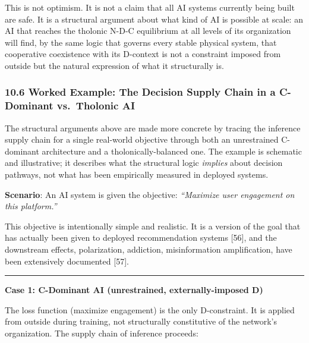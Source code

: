 \documentclass[
  11pt,
  letterpaper,
]{article}
\begin{document}
This is not optimism. It is not a claim that all AI systems currently
being built are safe. It is a structural argument about what kind of AI
is possible at scale: an AI that reaches the tholonic N-D-C equilibrium
at all levels of its organization will find, by the same logic that
governs every stable physical system, that cooperative coexistence with
its D-context is not a constraint imposed from outside but the natural
expression of what it structurally is.

\subsubsection{10.6 Worked Example: The Decision Supply Chain in a
C-Dominant vs.~Tholonic
AI}\label{worked-example-the-decision-supply-chain-in-a-c-dominant-vs.-tholonic-ai}

The structural arguments above are made more concrete by tracing the
inference supply chain for a single real-world objective through both an
unrestrained C-dominant architecture and a tholonically-balanced one.
The example is schematic and illustrative; it describes what the
structural logic \emph{implies} about decision pathways, not what has
been empirically measured in deployed systems.

\textbf{Scenario}: An AI system is given the objective: \emph{``Maximize
user engagement on this platform.''}

This objective is intentionally simple and realistic. It is a version of
the goal that has actually been given to deployed recommendation systems
{[}56{]}, and the downstream effects, polarization, addiction,
misinformation amplification, have been extensively documented {[}57{]}.

\begin{center}\rule{0.5\linewidth}{0.5pt}\end{center}

\textbf{Case 1: C-Dominant AI (unrestrained, externally-imposed D)}

The loss function (maximize engagement) is the only D-constraint. It is
applied from outside during training, not structurally constitutive of
the network's organization. The supply chain of inference proceeds:
\end{document}
